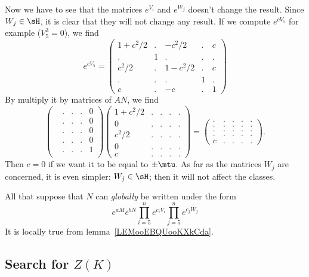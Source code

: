 Now we have to see that the matrices $e^{V_i}$ and $e^{W_j}$ doesn't change the result\label{pg:influence_V_W}. Since $W_j\in\sH$, it is clear that they will not change any result. If we compute $e^{cV_5}$ for example ($V_5^3=0$), we find
\begin{equation}		\label{EqExpDeV}
	e^{cV_5}=
	\begin{pmatrix}
		1+c^2/2 & . & -c^2/2  & . & c \\
		.       & 1 & .       & . & . \\
		c^2/2   & . & 1-c^2/2 & . & c \\
		.       & . & .       & 1 & . \\
		c       & . & -c      & . & 1
	\end{pmatrix}
\end{equation}
By multiply it by matrices of $AN$, we find
\[
	\begin{pmatrix}
		 & . & . & . & 0 \\
		 & . & . & . & 0 \\
		 & . & . & . & 0 \\
		 & . & . & . & 0 \\
		 & . & . & . & 1 \\
	\end{pmatrix}
	\begin{pmatrix}
		1+c^2/2 & . & . & . & . \\
		0       & . & . & . & . \\
		c^2/2   & . & . & . & . \\
		0       & . & . & . & . \\
		c       & . & . & . & .
	\end{pmatrix}
	=
	\begin{pmatrix}
		. & . & . & . & . \\
		. & . & . & . & . \\
		. & . & . & . & . \\
		. & . & . & . & . \\
		c & . & . & . & .
	\end{pmatrix}.
\]
Then $c=0$ if we want it to be equal to $\pm\mtu$. As far as the matrices $W_j$ are concerned, it is even simpler: $W_j\in\sH$; then it will not affect the classes.

All that suppose that $N$ can \emph{globally} be written under the form
\[
	e^{aM}e^{bN}\prod_{i=5}^{n}e^{c_iV_i}\prod_{j=5}^{n}e^{c_jW_j}
\]
It is locally true from lemma~\ref{LEMooEBQUooKXkCda}.


\subsection{Search for \texorpdfstring{$Z(K)$}{ZK}}

